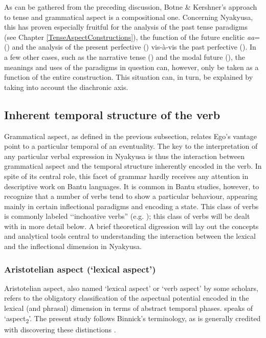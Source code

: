As can be gathered from the preceding discussion, Botne \& Kershner's approach to tense and grammatical aspect is a compositional one. Concerning Nyakyusa, this has proven especially fruitful for the analysis of the past tense paradigms (see Chapter \ref{TenseAspectConstructions}), the function of the future enclitic \textit{aa}= () and the analysis of the present perfective () vis-à-vis the past perfective (). In a few other cases, such as the narrative tense () and the modal future (), the meanings and uses of the paradigms in question can, however, only be taken as a function of the entire construction. This situation can, in turn, be explained by taking into account the diachronic axis.
\subsection{Inherent temporal structure of the verb}\label{InherentTemporalStructure}
Grammatical aspect, as defined in the previous subsection, relates Ego's vantage point to a particular temporal  of an eventuality. The key to the interpretation of any particular verbal expression in Nyakyusa is thus the interaction between grammatical aspect and the temporal structure inherently encoded in the verb. In spite of its central role, this facet of grammar hardly receives any attention in descriptive work on Bantu languages. It is common in Bantu studies, however, to recognize that a number of verbs tend to show a particular behaviour, appearing mainly in certain inflectional paradigms and encoding a state. This class of verbs is commonly labeled \lq\lq inchoative verbs'' (e.g. \citealt[55–60]{ColeD1955}); this class of verbs will be dealt with in more detail below. A brief theoretical digression will lay out the concepts and analytical tools central to understanding the interaction between the lexical and the inflectional dimension in Nyakyusa.
\subsubsection{Aristotelian aspect (\lq lexical aspect')}\label{AristotelianAspect}
Aristotelian aspect, also named \lq lexical aspect' or \lq verb aspect' by some scholars, refers to the obligatory classification of the aspectual potential encoded in the lexical (and phrasal) dimension in terms of abstract temporal phases. \citet{SasseHJ2002} speaks of \lq aspect\textsubscript{2}'. The present study follows Binnick's terminology, as  is generally credited with discovering these distinctions \citep[171f]{BinnickR1991}.

